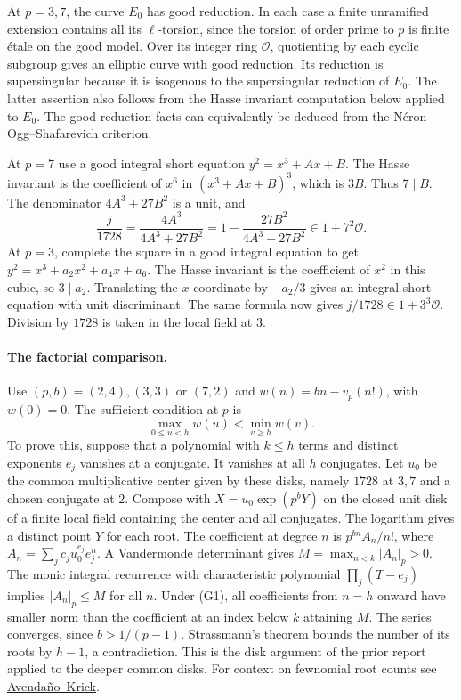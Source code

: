 At $p=3,7$, the curve $E_0$ has good reduction. In each case a finite
unramified extension contains all its $\ell$-torsion, since the torsion
of order prime to $p$ is finite \'etale on the good model. Over its
integer ring $\mathcal O$, quotienting by each cyclic subgroup gives
an elliptic curve with good reduction. Its reduction is supersingular
because it is isogenous to the supersingular reduction of $E_0$.
The latter assertion also follows from the Hasse invariant computation
below applied to $E_0$. The good-reduction facts can equivalently be
deduced from the N\'eron--Ogg--Shafarevich criterion.

At $p=7$ use a good integral short equation $y^2=x^3+Ax+B$.
The Hasse invariant is the coefficient of $x^6$ in $(x^3+Ax+B)^3$,
which is $3B$. Thus $7\mid B$. The denominator $4A^3+27B^2$ is a
unit, and
\[
 \frac{j}{1728}=\frac{4A^3}{4A^3+27B^2}
                 =1-\frac{27B^2}{4A^3+27B^2}\in 1+7^2\mathcal O .
\]
At $p=3$, complete the square in a good integral equation to get
$y^2=x^3+a_2x^2+a_4x+a_6$. The Hasse invariant is the coefficient of
$x^2$ in this cubic, so $3\mid a_2$. Translating the $x$ coordinate
by $-a_2/3$ gives an integral short equation with unit discriminant.
The same formula now gives $j/1728\in 1+3^3\mathcal O$. Division by
$1728$ is taken in the local field at $3$.



\paragraph{The factorial comparison.}
Use $(p,b)=(2,4),(3,3)$ or $(7,2)$ and $w(n)=bn-v_p(n!)$, with $w(0)=0$.
The sufficient condition at $p$ is
\[
       \max_{0\le u<h}w(u)<\min_{v\ge h}w(v).                 \tag{G1}
\]
To prove this, suppose that a polynomial with $k\le h$ terms and
distinct exponents $e_j$ vanishes at a conjugate. It vanishes at all
$h$ conjugates. Let $u_0$ be the common multiplicative center given by these disks,
namely $1728$ at $3,7$ and a chosen conjugate at $2$. Compose with
$X=u_0\exp(p^bY)$ on the closed unit disk of a finite local field
containing the center and all conjugates. The logarithm gives a distinct point
$Y$ for each root. The coefficient at degree $n$ is $p^{bn}A_n/n!$,
where $A_n=\sum_j c_ju_0^{e_j}e_j^n$. A Vandermonde determinant
gives $M=\max_{n<k}|A_n|_p>0$. The monic integral recurrence with
characteristic polynomial $\prod_j(T-e_j)$ implies $|A_n|_p\le M$
for all $n$. Under (G1), all coefficients from $n=h$ onward have
smaller norm than the coefficient at an index below $k$ attaining
$M$. The series converges, since $b>1/(p-1)$.
Strassmann's theorem bounds the number of its roots by $h-1$, a
contradiction. This is the disk argument of the prior report applied
to the deeper common disks. For context on fewnomial root counts see
\href{https://arxiv.org/abs/1008.4808}{Avenda\~no--Krick}.

